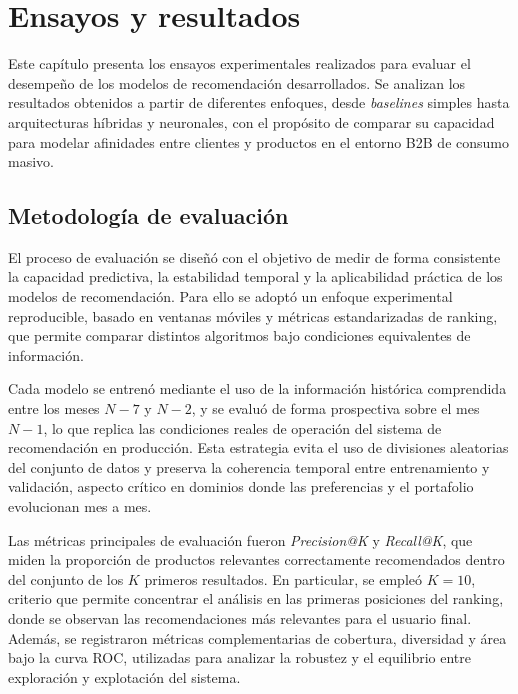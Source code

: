 
\chapter{Ensayos y resultados} %

\label{Chapter4} %
Este capítulo presenta los ensayos experimentales realizados para evaluar el desempeño de los modelos de recomendación desarrollados.  
Se analizan los resultados obtenidos a partir de diferentes enfoques, desde \textit{baselines} simples hasta arquitecturas híbridas y neuronales, con el propósito de comparar su capacidad para modelar afinidades entre clientes y productos en el entorno B2B de consumo masivo.

\section{Metodología de evaluación}

El proceso de evaluación se diseñó con el objetivo de medir de forma consistente la capacidad predictiva, la estabilidad temporal y la aplicabilidad práctica de los modelos de recomendación. Para ello se adoptó un enfoque experimental reproducible, basado en ventanas móviles y métricas estandarizadas de ranking, que permite comparar distintos algoritmos bajo condiciones equivalentes de información.

Cada modelo se entrenó mediante el uso de la información histórica comprendida entre los meses $N-7$ y $N-2$, y se evaluó de forma prospectiva sobre el mes $N-1$, lo que replica las condiciones reales de operación del sistema de recomendación en producción. Esta estrategia evita el uso de divisiones aleatorias del conjunto de datos y preserva la coherencia temporal entre entrenamiento y validación, aspecto crítico en dominios donde las preferencias y el portafolio evolucionan mes a mes.

Las métricas principales de evaluación fueron \textit{Precision@K} y \textit{Recall@K}, que miden la proporción de productos relevantes correctamente recomendados dentro del conjunto de los $K$ primeros resultados. En particular, se empleó $K=10$, criterio que permite concentrar el análisis en las primeras posiciones del ranking, donde se observan las recomendaciones más relevantes para el usuario final. Además, se registraron métricas complementarias de cobertura, diversidad y área bajo la curva ROC, utilizadas para analizar la robustez y el equilibrio entre exploración y explotación del sistema.

